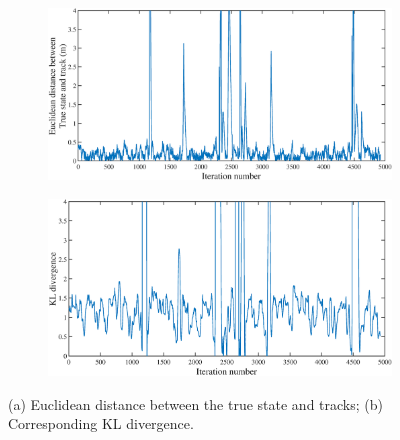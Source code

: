 \begin{figure}
    \centering
    \begin{subfigure}[tb]{0.5\textwidth}
        \includegraphics[width=\textwidth]{img/Err_figure_cropped.eps}
        \caption{}
        \label{fig:gull}
    \end{subfigure}
    \begin{subfigure}[tb]{0.5\textwidth}
        \includegraphics[width=\textwidth]{img/KL_figure_cropped.eps}
        \caption{}
        \label{fig:tiger}
    \end{subfigure}
    \caption{(a) Euclidean distance between the true state and tracks; (b) Corresponding KL divergence.}
    \label{fig:KL_and_err}
\end{figure}